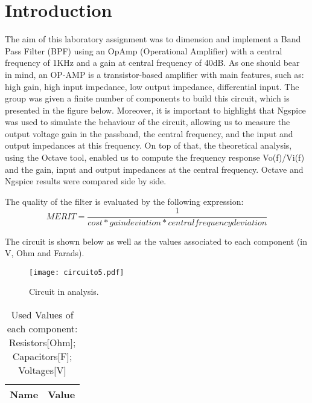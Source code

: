 \section{Introduction}
\label{introduction}


\par The aim of this laboratory assignment was to dimension and implement a Band Pass Filter (BPF) using an OpAmp (Operational Amplifier) with a central frequency of 1KHz and a gain at central frequency of 40dB. As one should bear in mind, an OP-AMP is a transistor-based amplifier with main features, such as: high gain, high input impedance, low output impedance, differential input. The group was given a finite number of components to build this circuit, which is presented in the figure below. Moreover, it is important to highlight that Ngspice was used to simulate the behaviour of the circuit, allowing us to measure the output voltage gain in the passband, the central frequency, and the input and output impedances at this frequency. On top of that, the theoretical analysis, using the Octave tool, enabled us to compute the frequency response Vo(f)/Vi(f) and the gain, input and output impedances at the central frequency. Octave and Ngspice results were compared side by side.

\par The quality of the filter is evaluated by the following expression:
\begin {equation}
	 MERIT = \frac{1}{cost * gain deviation * central frequency deviation}   	
	\label{merit}
\end{equation}

The circuit is shown below as well as the values associated to each component (in V, Ohm and Farads).

\begin{figure}[ht] \centering
\texttt{[image: circuito5.pdf]}
\caption{Circuit in analysis.}
\label{circuito todo}
\end{figure}


\begin{table}[ht]
  \centering
  \begin{tabular}{|l|r|}
    \hline    
    {\bf Name} & {\bf Value} \\ \hline
    
  \end{tabular}
  \caption{Used Values of each component: Resistors[Ohm]; Capacitors[F]; Voltages[V]}
  \label{tab:3}
\end{table}


\newpage


